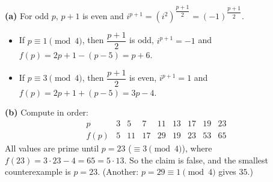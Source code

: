 \textbf{(a)} For odd $p$, $p+1$ is even and $i^{p+1}=(i^2)^{\dfrac{p+1}{2}}=(-1)^{\dfrac{p+1}{2}}$.
\begin{itemize}
\item If $p\equiv1\pmod4$, then $\dfrac{p+1}{2}$ is odd, $i^{p+1}=-1$ and $f(p)=2p+1-(p-5)=p+6$.
\item If $p\equiv3\pmod4$, then $\dfrac{p+1}{2}$ is even, $i^{p+1}=1$ and $f(p)=2p+1+(p-5)=3p-4$.
\end{itemize}

\textbf{(b)} Compute in order:
\[
\begin{array}{c|cccccccc}
p & 3 & 5 & 7 & 11 & 13 & 17 & 19 & 23\\\hline
f(p) & 5 & 11 & 17 & 29 & 19 & 23 & 53 & 65
\end{array}
\]
All values are prime until $p=23$ ($\equiv3\pmod4$), where $f(23)=3\cdot23-4=65=5\cdot13$. So the claim is false, and the smallest counterexample is $\boxed{p=23}$. (Another: $p=29\equiv1\pmod4$ gives $35$.)
